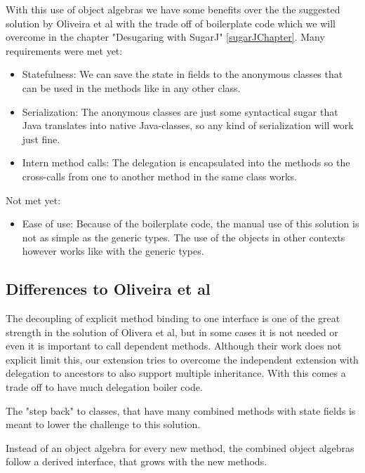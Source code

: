 \documentclass{report}
\begin{document}
With this use of object algebras we have some benefits over the the suggested solution by Oliveira et al with the trade off of boilerplate code which we will overcome in the chapter "Desugaring with SugarJ" \ref{sugarJChapter}. Many requirements were met yet:

\begin{itemize}
\item Statefulness: We can save the state in fields to the anonymous classes that can be used in the methods like in any other class.

\item Serialization: The anonymous classes are just some syntactical sugar that Java translates into native Java-classes, so any kind of serialization will work just fine.

\item Intern method calls: The delegation is encapsulated into the methods so the cross-calls from one to another method in the same class works.
\end{itemize}

Not met yet:

\begin{itemize}
\item Ease of use: Because of the boilerplate code, the manual use of this solution is not as simple as the generic types. The use of the objects in other contexts however works like with the generic types.
\end{itemize}

\subsection{Differences to Oliveira et al \cite{Oliv-Extensibility-2012}}

The decoupling of explicit method binding to one interface is one of the great strength in the solution of Olivera et al, but in some cases it is not needed or even it is important to call dependent methods. Although their work does not explicit limit this, our extension tries to overcome the independent extension with delegation to ancestors to also support multiple inheritance. With this comes a trade off to have much delegation boiler code.

The "step back" to classes, that have many combined methods with state fields is meant to lower the challenge to this solution.  

Instead of an object algebra for every new method, the combined object algebras follow a derived interface, that grows with the new methods.
\end{document}
